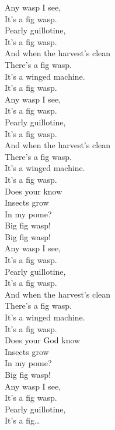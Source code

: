 


Any wasp I see, \\
It's a fig wasp. \\
Pearly guillotine, \\
It's a fig wasp. \\
And when the harvest's clean \\
There's a fig wasp. \\
It's a winged machine. \\
It's a fig wasp. \\

Any wasp I see, \\
It's a fig wasp. \\
Pearly guillotine, \\
It's a fig wasp. \\
And when the harvest's clean \\
There's a fig wasp. \\
It's a winged machine. \\
It's a fig wasp. \\

Does your  know \\
Insects grow \\
In my pome? \\

Big fig wasp! \\
Big fig wasp! \\

Any wasp I see, \\
It's a fig wasp. \\
Pearly guillotine, \\
It's a fig wasp. \\
And when the harvest's clean \\
There's a fig wasp. \\
It's a winged machine. \\
It's a fig wasp. \\

Does your God know \\
Insects grow \\
In my pome? \\

Big fig wasp! \\

Any wasp I see, \\
It's a fig wasp. \\
Pearly guillotine, \\
It's a fig… \\

